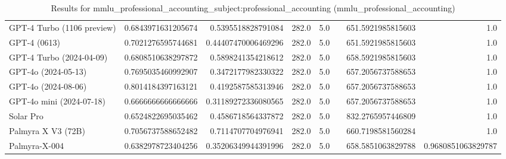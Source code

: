 \begin{table}[htp]
{\begin{tabular}{lrrrrrrr}
GPT-4 Turbo (1106 preview) & 0.6843971631205674 & 0.5395518828791084 & 282.0 & 5.0 &  & 651.5921985815603 & 1.0 \\
GPT-4 (0613) & 0.7021276595744681 & 0.44407470006469296 & 282.0 & 5.0 &  & 651.5921985815603 & 1.0 \\
GPT-4 Turbo (2024-04-09) & 0.6808510638297872 & 0.5898241354218612 & 282.0 & 5.0 &  & 658.5921985815603 & 1.0 \\
GPT-4o (2024-05-13) & 0.7695035460992907 & 0.3472177982330322 & 282.0 & 5.0 &  & 657.2056737588653 & 1.0 \\
GPT-4o (2024-08-06) & 0.8014184397163121 & 0.4192587585313946 & 282.0 & 5.0 &  & 657.2056737588653 & 1.0 \\
GPT-4o mini (2024-07-18) & 0.6666666666666666 & 0.31189272336080565 & 282.0 & 5.0 &  & 657.2056737588653 & 1.0 \\
Solar Pro & 0.6524822695035462 & 0.4586718564337872 & 282.0 & 5.0 &  & 832.2765957446809 & 1.0 \\
Palmyra X V3 (72B) & 0.7056737588652482 & 0.7114707704976941 & 282.0 & 5.0 &  & 660.7198581560284 & 1.0 \\
Palmyra-X-004 & 0.6382978723404256 & 0.35206349944391996 & 282.0 & 5.0 &  & 658.5851063829788 & 0.9680851063829787 \\
\bottomrule
\end{tabular}}
\caption{Results for mmlu_professional_accounting_subject:professional_accounting (mmlu_professional_accounting)}
\label{fig:mmlu_professional_accounting_subject:professional_accounting (mmlu_professional_accounting)}
\end{table}